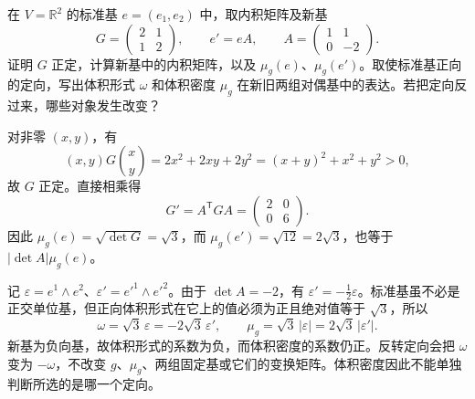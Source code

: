 \begin{exercise}
	\label{g1:exr:1202-density-orientation}
	在 \(V=\mathbb R^2\) 的标准基 \(e=(e_1,e_2)\) 中，取内积矩阵及新基
	\[
		G=\begin{pmatrix}2&1\\1&2\end{pmatrix},\qquad
		e'=eA,\qquad A=\begin{pmatrix}1&1\\0&-2\end{pmatrix}.
	\]
	证明 \(G\) 正定，计算新基中的内积矩阵，以及 \(\mu_g(e)\)、\(\mu_g(e')\)。取使标准基正向的定向，写出体积形式 \(\omega\) 和体积密度 \(\mu_g\) 在新旧两组对偶基中的表达。若把定向反过来，哪些对象发生改变？
\end{exercise}
\begin{solution}
	对非零 \((x,y)\)，有
	\[
		(x,y)G\binom{x}{y}=2x^2+2xy+2y^2=(x+y)^2+x^2+y^2>0,
	\]
	故 \(G\) 正定。直接相乘得
	\[
		G'=A^{\mathsf T}GA=\begin{pmatrix}2&0\\0&6\end{pmatrix}.
	\]
	因此 \(\mu_g(e)=\sqrt{\det G}=\sqrt3\)，而 \(\mu_g(e')=\sqrt{12}=2\sqrt3\)，也等于 \(|\det A|\mu_g(e)\)。

	记 \(\varepsilon=e^1\wedge e^2\)、\(\varepsilon'=e'^1\wedge e'^2\)。由于 \(\det A=-2\)，有 \(\varepsilon'=-\tfrac12\varepsilon\)。标准基虽不必是正交单位基，但正向体积形式在它上的值必须为正且绝对值等于 \(\sqrt3\)，所以
	\[
		\omega=\sqrt3\,\varepsilon=-2\sqrt3\,\varepsilon',\qquad
		\mu_g=\sqrt3\,|\varepsilon|=2\sqrt3\,|\varepsilon'|.
	\]
	新基为负向基，故体积形式的系数为负，而体积密度的系数仍正。反转定向会把 \(\omega\) 变为 \(-\omega\)，不改变 \(g\)、\(\mu_g\)、两组固定基或它们的变换矩阵。体积密度因此不能单独判断所选的是哪一个定向。
\end{solution}

